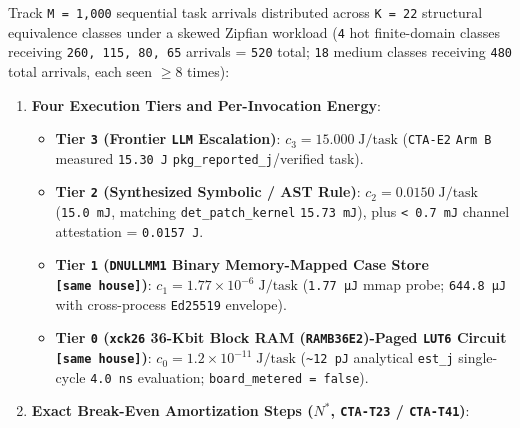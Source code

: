 \documentclass[10pt,letterpaper]{article}
\providecommand{\tightlist}{\setlength{\itemsep}{1pt}\setlength{\parskip}{0pt}}
\begin{document}
Track \texttt{M\ =\ 1,\allowbreak{}000} sequential task arrivals distributed across
\texttt{K\ =\ 22} structural equivalence classes under a skewed Zipfian
workload (\texttt{4} hot finite-domain classes receiving
\texttt{260,\allowbreak{}\ 115,\allowbreak{}\ 80,\allowbreak{}\ 65} arrivals = \texttt{520} total; \texttt{18}
medium classes receiving \texttt{480} total arrivals, each seen
\(\ge 8\) times):

\begin{enumerate}
\def\labelenumi{\arabic{enumi}.}
\tightlist
\item
  \textbf{Four Execution Tiers and Per-Invocation Energy}:

  \begin{itemize}
  \tightlist
  \item
    \textbf{Tier \texttt{3} (Frontier \texttt{LLM} Escalation)}:
    \(c_3 = 15.000\;\text{J/task}\) (\texttt{CTA-E2} \texttt{Arm\ B}
    measured \texttt{15.30\ J} \texttt{pkg\_\allowbreak{}reported\_\allowbreak{}j}/verified task).
  \item
    \textbf{Tier \texttt{2} (Synthesized Symbolic / AST Rule)}:
    \(c_2 = 0.0150\;\text{J/task}\) (\texttt{15.0\ mJ}, matching
    \texttt{det\_\allowbreak{}patch\_\allowbreak{}kernel} \texttt{15.73\ mJ}), plus
    \texttt{\textless{}\ 0.7\ mJ} channel attestation =
    \texttt{0.0157\ J}.
  \item
    \textbf{Tier \texttt{1} (\texttt{DNULLMM1} Binary Memory-Mapped Case
    Store \texttt{{[}same\ house{]}})}:
    \(c_1 = 1.77 \times 10^{-6}\;\text{J/task}\) (\texttt{1.77\ µJ} mmap
    probe; \texttt{644.8\ µJ} with cross-process \texttt{Ed25519}
    envelope).
  \item
    \textbf{Tier \texttt{0} (\texttt{xck26} 36-Kbit Block RAM
    (\texttt{RAMB36E2})-Paged \texttt{LUT6} Circuit
    \texttt{{[}same\ house{]}})}:
    \(c_0 = 1.2 \times 10^{-11}\;\text{J/task}\)
    (\texttt{\textasciitilde{}12\ pJ} analytical \texttt{est\_j}
    single-cycle \texttt{4.0\ ns} evaluation;
    \texttt{board\_\allowbreak{}metered\ =\ false}).
  \end{itemize}
\item
  \textbf{Exact Break-Even Amortization Steps (\(N^*\), \texttt{CTA-T23}
  / \texttt{CTA-T41})}:


\end{enumerate}
\end{document}
